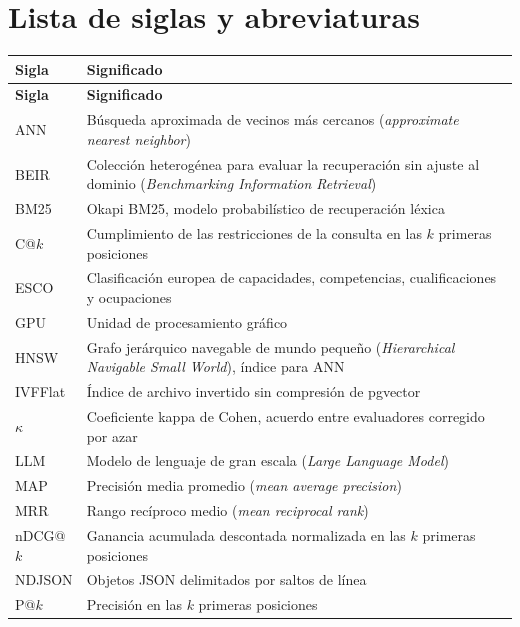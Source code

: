 \chapter*{Lista de siglas y abreviaturas}

{\renewcommand{\arraystretch}{1.25}
\begin{longtable}[l]{>{\raggedright\arraybackslash}p{2.2cm}>{\raggedright\arraybackslash}p{12cm}}
\textbf{Sigla} & \textbf{Significado} \\[0.5ex] \hline
\endfirsthead
\textbf{Sigla} & \textbf{Significado} \\[0.5ex] \hline
\endhead
ANN & Búsqueda aproximada de vecinos más cercanos (\textit{approximate nearest neighbor}) \\
BEIR & Colección heterogénea para evaluar la recuperación sin ajuste al dominio (\textit{Benchmarking Information Retrieval}) \\
BM25 & Okapi BM25, modelo probabilístico de recuperación léxica \\
C@$k$ & Cumplimiento de las restricciones de la consulta en las $k$ primeras posiciones \\
ESCO & Clasificación europea de capacidades, competencias, cualificaciones y ocupaciones \\
GPU & Unidad de procesamiento gráfico \\
HNSW & Grafo jerárquico navegable de mundo pequeño (\textit{Hierarchical Navigable Small World}), índice para ANN \\
IVFFlat & Índice de archivo invertido sin compresión de pgvector \\
$\kappa$ & Coeficiente kappa de Cohen, acuerdo entre evaluadores corregido por azar \\
LLM & Modelo de lenguaje de gran escala (\textit{Large Language Model}) \\
MAP & Precisión media promedio (\textit{mean average precision}) \\
MRR & Rango recíproco medio (\textit{mean reciprocal rank}) \\
nDCG@$k$ & Ganancia acumulada descontada normalizada en las $k$ primeras posiciones \\
NDJSON & Objetos JSON delimitados por saltos de línea \\
P@$k$ & Precisión en las $k$ primeras posiciones \\

\end{longtable}}
